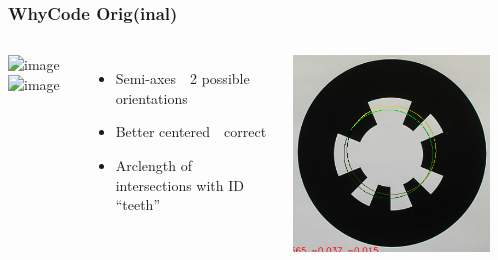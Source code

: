 \documentclass[aspectratio=169]{rubeamer}
\newif\ifpause
\newcommand{\mypause}{\ifpause \pause \fi}
\begin{document}
\begin{frame}
  \frametitle{WhyCode Orig(inal)}
  \begin{columns}
    \includegraphics<1-4>[width=0.9\textwidth]{whycode_layout}\includegraphics<5>[width=0.9\textwidth]{whycode_layout_with_sample_lines}
    \mypause
    \begin{itemize}
      \item Semi-axes~\textrightarrow~2 possible orientations
      \mypause
      \item Better centered~\textrightarrow~correct
      \mypause
      \item Arclength of intersections with ID ``teeth''
    \end{itemize}
    \centering
    \onslide
    \includegraphics[width=0.9\textwidth]{whycode_orig_both_solutions_cropped}
  \end{columns}
\end{frame}

\else
\end{document}
